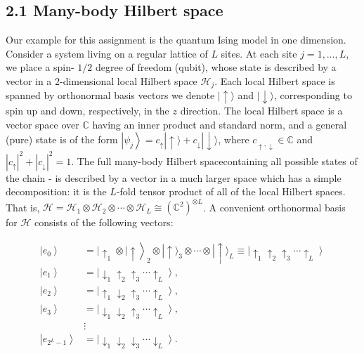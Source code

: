 \documentclass[12pt]{article}
\begin{document}
\subsection*{2.1 Many-body Hilbert space}
Our example for this assignment is the quantum Ising model in one dimension. Consider a system living on a regular lattice of $L$ sites. At each site $j=1, \ldots, L$, we place a spin- $1 / 2$ degree of freedom (qubit), whose state is described by a vector in a 2-dimensional local Hilbert space $\mathcal{H}_{j}$. Each local Hilbert space is spanned by orthonormal basis vectors we denote $|\uparrow\rangle$ and $|\downarrow\rangle$, corresponding to spin up and down, respectively, in the $z$ direction. The local Hilbert space is a vector space over $\mathbb{C}$ having an inner product and standard norm, and a general (pure) state is of the form $\left|\psi_{j}\right\rangle=c_{\uparrow}|\uparrow\rangle+c_{\downarrow}|\downarrow\rangle$, where $c_{\uparrow, \downarrow} \in \mathbb{C}$ and $\left|c_{\uparrow}\right|^{2}+\left|c_{\downarrow}\right|^{2}=1$. The full many-body Hilbert spacecontaining all possible states of the chain - is described by a vector in a much larger space which has a simple decomposition: it is the $L$-fold tensor product of all of the local Hilbert spaces. That is, $\mathcal{H}=\mathcal{H}_{1} \otimes \mathcal{H}_{2} \otimes \cdots \otimes \mathcal{H}_{L} \cong\left(\mathbb{C}^{2}\right)^{\otimes L}$. A convenient orthonormal basis for $\mathcal{H}$ consists of the following vectors:


\begin{align*}
\left|e_{0}\right\rangle & \left.=\left|\uparrow_{1} \otimes\right| \uparrow\right\rangle_{2} \otimes|\uparrow\rangle_{3} \otimes \cdots \otimes|\uparrow\rangle_{L} \equiv\left|\uparrow_{1} \uparrow_{2} \uparrow_{3} \cdots \uparrow_{L}\right\rangle \\
\left|e_{1}\right\rangle & =\left|\downarrow_{1} \uparrow_{2} \uparrow_{3} \cdots \uparrow_{L}\right\rangle, \\
\left|e_{2}\right\rangle & =\left|\uparrow_{1} \downarrow_{2} \uparrow_{3} \cdots \uparrow_{L}\right\rangle,  \tag{1}\\
\left|e_{3}\right\rangle & =\left|\downarrow_{1} \downarrow_{2} \uparrow_{3} \cdots \uparrow_{L}\right\rangle, \\
& \vdots \\
\left|e_{2^{L}-1}\right\rangle & =\left|\downarrow_{1} \downarrow_{2} \downarrow_{3} \cdots \downarrow_{L}\right\rangle .
\end{align*}
\end{document}
